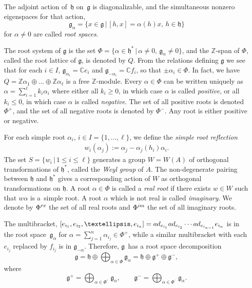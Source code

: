 \documentclass[11pt]{article}
\numberwithin{equation}{section}
\numberwithin{equation}{section}
\def\C{{\mathbb C}}
\def\Z{\mathbb{Z}}
\def\a{\alpha}
\def\roots{{\Phi}}
\def\g{\mathfrak{g}}
\def\fg{\mathfrak{g}}
\def\h{\mathfrak{h}}
\begin{document}
The adjoint action of~$\h$ on~$\g$ is diagonalizable, and the simultaneous nonzero eigenspaces for that action,
\[\g_{\alpha} = \{x\in \g\,|\,[h,x]=\alpha(h)x,\, h\in \h\}\]
for $\alpha \neq 0$ are called {\it root spaces}.

The root system of $\g$ is the set $\roots= \{\alpha\in\h^*\, |\, \alpha \neq 0, \,\g_{\alpha}\neq 0\}$, and the $\Z$-span of $\roots$, called the
root lattice of $\g$, is denoted by $Q$. From the relations defining $\g$ we see that for each $i\in I$, $\g_{\alpha_i} = \C e_i$ and
$\g_{-\alpha_i} = \C f_i$, so that $\pm \alpha_i \in\roots$. In fact, we have
$Q=\Z\alpha_1\oplus\dots \oplus \Z\alpha_{\ell}$ is a free $\Z$-module.
Every $\alpha\in\roots$ can be written uniquely as $\alpha=\sum\limits_{i=1}^{\ell} k_i\alpha_i$ where either all $k_i\geq 0$, in which case $\alpha$ is called {\it positive}, or all $k_i\leq 0$, in which case $\alpha$ is called {\it negative}. The set of all positive roots is denoted $\roots^+$, and
the set of all negative roots is denoted by $\roots^-$. Any root is either positive or negative.

For each simple root $\alpha_i$, $i\in I=\{1,\dots, \ell\}$, we define the {\it simple root reflection}
\begin{gather}\label{equation:simple_reflection}
w_i(\alpha_j) := \alpha_j - \alpha_j(h_i)\alpha_i.
\end{gather}
The set $S = \{w_i\,|\, 1\leq i\leq\ell\}$ generates a group $W=W(A)$ of orthogonal transformations of $\h^*$, called the {\it Weyl group} of $A$. The non-degenerate pairing between $\h$ and $\h^*$ gives a corresponding action of $W$ as orthogonal transformations on $\h$. A root $\alpha\in\roots$ is called a {\it real root} if there exists $w\in W$ such that $w\alpha$ is a~simple root. A root $\alpha$ which is not real is called {\it imaginary}. We denote by $\roots^{\rm re}$ the set of all real roots and $\roots^{\rm im}$ the set of all imaginary roots.

The multibracket, $[e_{i_1},e_{i_2},\dots,e_{i_n}] = {\rm ad}_{e_{i_1}} {\rm ad}_{e_{i_2}} \cdots {\rm ad}_{e_{i_{n-1}}} e_{i_n}$ is in the root space~$\fg_\a$ for $\alpha = \sum\limits_{j=1}^n \alpha_{i_j} \in \roots^+$, while a similar multibracket with each $e_{i_j}$ replaced
by $f_{i_j}$ is in $\fg_{-\a}$. Therefore, $\g$~has a root space decomposition
\cite[Theorem~1.2]{Kac90}
\[\g = \h \oplus \bigoplus_{\alpha\in\roots} \g_{\a} = \h \oplus \g^+ \oplus \g^-,\]
where
\[\g^+ =\bigoplus_{\alpha\in\roots^{^+}}\g_{\alpha},\qquad
\g^- = \bigoplus_{\alpha\in\roots^{^-}}\g_{\alpha}.\]
\end{document}
